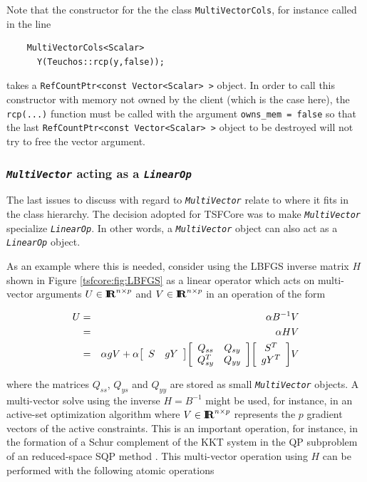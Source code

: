 {}\noindent{}Note that the constructor for the the class
{}\texttt{MultiVectorCols}, for instance called in the line

{\scriptsize\begin{verbatim}
    MultiVectorCols<Scalar>
      Y(Teuchos::rcp(y,false));
\end{verbatim}}

{}\noindent{}takes a {}\texttt{RefCountPtr<const Vector<Scalar> >}
object.  In order to call this constructor with memory not owned by
the client (which is the case here), the {}\texttt{rcp(...)} function
must be called with the argument {}\texttt{owns\_mem = false} so that
the last {}\texttt{RefCountPtr<const Vector<Scalar> >} object to be
destroyed will not try to free the vector argument.

%
\subsubsection{\texttt{\textit{Multi\-Vector}} acting as a {}\texttt{\textit{LinearOp}}}
\label{tsfcore:sec:multi_vec_linear_op}
%

The last issues to discuss with regard to
{}\texttt{\textit{Multi\-Vector}} relate to where it fits in the class
hierarchy.  The decision adopted for TSFCore was to make
{}\texttt{\textit{Multi\-Vector}} specialize
{}\texttt{\textit{LinearOp}}.  In other words, a
{}\texttt{\textit{Multi\-Vector}} object can also act as a
{}\texttt{\textit{LinearOp}} object.

As an example where this is needed, consider using the LBFGS inverse
matrix $H$ shown in Figure {}\ref{tsfcore:fig:LBFGS} as a linear
operator which acts on multi-vector arguments $U\in\RE^{n \times p}$
and $V\in\RE^{n \times p}$ in an operation of the form

\begin{eqnarray*}
U & = & \alpha B^{-1} V \\
  & = & \alpha H V \\
  & = & \alpha g V + \alpha
                            {\bmat{cc} S & g Y \emat}
                            {\bmat{cc} Q_{ss} & Q_{sy} \\ Q_{sy}^T & Q_{yy} \emat}
                            {\bmat{c} S^T \\ g Y^T \emat} V
\end{eqnarray*}

where the matrices $Q_{ss}$, $Q_{ys}$ and $Q_{yy}$ are stored as small
{}\texttt{\textit{Multi\-Vector}} objects.  A multi-vector solve using
the inverse $H = B^{-1}$ might be used, for instance, in an active-set
optimization algorithm where $V\in\RE^{n \times p}$ represents the $p$
gradient vectors of the active constraints.  This is an important
operation, for instance, in the formation of a Schur complement of the
KKT system in the QP subproblem of an reduced-space SQP method
{}\cite{RABartlett_2001}.  This multi-vector operation using $H$ can
be performed with the following atomic operations

